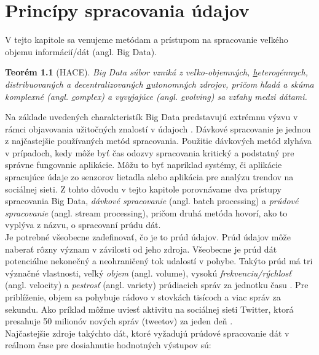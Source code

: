 \chapter{Princípy spracovania údajov}
\label{model-spracovania-udajov}
V tejto kapitole sa venujeme metódam a prístupom na spracovanie veľkého objemu informácií/dát (angl. Big Data). 

\newtheorem{theorem}{Teorém}[chapter]
\begin{theorem}[HACE]
	Big Data súbor vzniká z veľko-objemných, \underline{h}eterogénnych, distribuovaných a decentralizovaných \underline{a}utonomných zdrojov, pričom hľadá a skúma komplexné (angl. \underline{c}omplex) a vyvyjajúce (angl. \underline{e}volving) sa vzťahy medzi dátami.
\end{theorem}
Na základe uvedených charakteristík Big Data predstavujú extrémnu výzvu v rámci objavovania užitočných znalostí v údajoch \citep{wu2014data}.
Dávkové spracovanie je jednou z najčastejšie používaných metód spracovania. Použitie dávkových metód zlyháva v prípadoch, kedy môže byť čas odozvy spracovania kritický a podstatný pre správne fungovanie aplikácie. Môžu to byť napríklad systémy, či aplikácie spracujúce údaje zo senzorov lietadla alebo aplikácia pre analýzu trendov na sociálnej sieti. Z tohto dôvodu v tejto kapitole porovnávame dva prístupy spracovania Big Data, \textit{dávkové spracovanie} (angl. batch processing) a \textit{prúdové spracovanie} (angl. stream processing), pričom druhá metóda hovorí, ako to vyplýva z názvu, o spracovaní prúdu dát. 
\\[5pt]
Je potrebné všeobecne zadefinovať, čo je to prúd údajov. Prúd údajov môže naberať rôzny význam v závilosti od jeho zdroja. Všeobecne je prúd dát potenciálne nekonečný a neohraničený tok udalostí v pohybe. Takýto prúd má tri význačné vlastnosti, veľký \textit{objem} (angl. volume), vysokú \textit{frekvenciu/rýchlosť} (angl. velocity) a \textit{pestrosť} (angl. variety) prúdiacich správ za jednotku času \citep{kaisler2013big}. Pre priblíženie, objem sa pohybuje rádovo v stovkách tisícoch a viac správ za sekundu. Ako príklad môžme uviesť aktivitu na sociálnej sieti Twitter, ktorá presahuje 50 milionóv nových správ (tweetov) za jeden deň \citep{mathioudakis2010twittermonitor}. 
\\[5pt]
Najčastejšie zdroje takýchto dát, ktoré vyžadujú prúdové spracovanie dát v reálnom čase pre dosiahnutie hodnotných výstupov \citep{boeing, kaisler2013big, toshniwal2014storm} sú:
